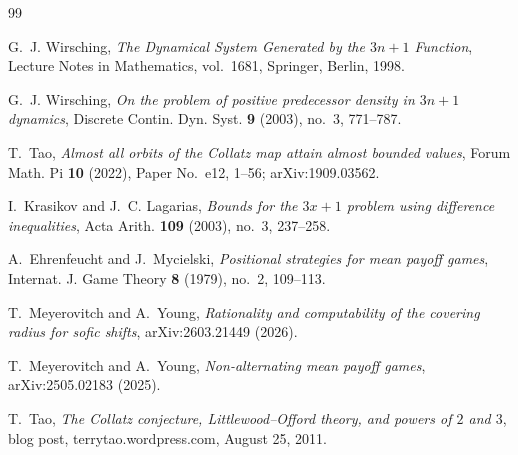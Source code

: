 \documentclass[11pt]{amsart}
\theoremstyle{plain}
\theoremstyle{definition}
\theoremstyle{remark}
\begin{document}
\renewcommand{\refname}{Refer\^encias}
\begin{thebibliography}{99}

G.~J. Wirsching, \emph{The Dynamical System Generated by the $3n+1$ Function}, Lecture Notes in
Mathematics, vol.~1681, Springer, Berlin, 1998.

G.~J. Wirsching, \emph{On the problem of positive predecessor density in $3n+1$ dynamics}, Discrete
Contin. Dyn. Syst. \textbf{9} (2003), no.~3, 771--787.

T.~Tao, \emph{Almost all orbits of the Collatz map attain almost bounded values}, Forum Math. Pi
\textbf{10} (2022), Paper No.~e12, 1--56; arXiv:1909.03562.

I.~Krasikov and J.~C. Lagarias, \emph{Bounds for the $3x+1$ problem using difference inequalities},
Acta Arith. \textbf{109} (2003), no.~3, 237--258.

A.~Ehrenfeucht and J.~Mycielski, \emph{Positional strategies for mean payoff games}, Internat. J.
Game Theory \textbf{8} (1979), no.~2, 109--113.

T.~Meyerovitch and A.~Young, \emph{Rationality and computability of the covering radius for sofic
shifts}, arXiv:2603.21449 (2026).

T.~Meyerovitch and A.~Young, \emph{Non-alternating mean payoff games}, arXiv:2505.02183 (2025).

T.~Tao, \emph{The Collatz conjecture, Littlewood--Offord theory, and powers of $2$ and $3$},
blog post, terrytao.wordpress.com, August 25, 2011.

\end{thebibliography}
\end{document}
